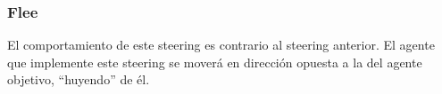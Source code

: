 \subsubsection{Flee}

El comportamiento de este steering es contrario al steering anterior. El agente que implemente este steering se moverá en dirección opuesta a la del agente objetivo, ``huyendo'' de él.


